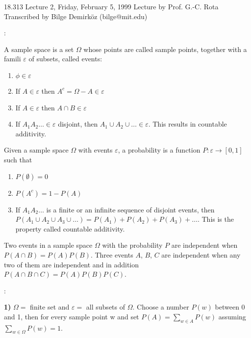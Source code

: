 {\Large 18.313 Lecture 2, Friday, February 5, 1999}\newline 
{\large Lecture by Prof. G.-C. Rota}\newline 
Transcribed by Bilge Demirk\"oz (bilge@mit.edu)\newline

:

A sample space is a set $\Omega$ whose points are called sample
points, together with a famili $\varepsilon$ of subsets, called events:
\begin{enumerate}
\item $\phi \in \varepsilon$
\item If $A \in \varepsilon$ then $A^c = \Omega - A \in \varepsilon$
\item If $A \in \varepsilon$ then $A \cap B \in \varepsilon$
\item If $A_1 A_2 \ldots \in \varepsilon$ disjoint, then $A_1 \cup A_2
\cup \ldots \in \varepsilon$. This results in countable additivity.
\end{enumerate}
Given a sample space $\Omega$ with events $\varepsilon$, a probability
is a function $P: \varepsilon \rightarrow [0,1]$ such that
\begin{enumerate}
\item $P(\emptyset)=0$
\item $P(A^c) = 1- P(A)$
\item If $A_1 A_2 \ldots$ is a finite or an infinite sequence of
disjoint events, then $P(A_1 \cup A_2 \cup A_3 \cup \ldots) = P(A_1) +
P(A_2) + P(A_3) + \ldots$. This is the property called countable
additivity.
\end{enumerate}
Two events in a sample space $\Omega$ with the probability $P$ are
independent when $P(A \cap B) =P(A) P(B)$. Three events $A$, $B$, $C$ are
independent when any two of them are independent and in addition $P(A
\cap B \cap C)=P(A) P(B) P(C)$.

: 

{\bf 1)} $\Omega =$ finite set and $\varepsilon =$ all subsets of $\Omega$.
Choose a number $P(w)$ between 0 and 1, then for every sample point w
and set $P(A) = \sum_{w\in A} P(w)$ assuming $\sum_{w\in\Omega}
P(w)=1$.

